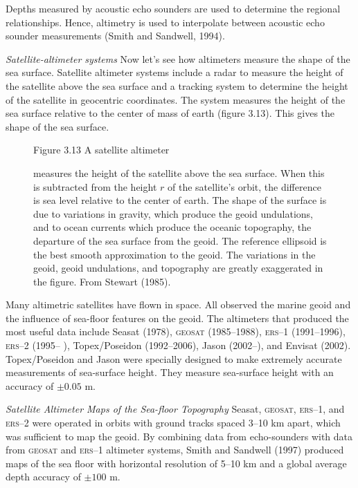 Depths measured by acoustic echo sounders are used to determine the
regional relationships. Hence, altimetry is used to interpolate
between acoustic echo sounder measurements (Smith and Sandwell, 1994).

\textit{Satellite-altimeter systems} Now let's see how altimeters measure the
shape of the sea surface. Satellite altimeter systems include a radar
to measure the height of the satellite above the sea surface and a
tracking system to determine the height of the satellite in geocentric
coordinates. The system measures the height of the sea surface
relative to the center of mass of earth (figure 3.13). This gives the
shape of the sea surface.

\begin{figure}[t!]
\footnotesize
Figure 3.13 A satellite altimeter \rule{0mm}{3ex}measures the height
of the satellite above the sea surface. When this is subtracted from
the height $r$ of the satellite's orbit, the difference is sea level
relative to the center of earth. The shape of the surface is due to
variations in gravity, which produce the geoid
undulations, and to ocean currents which
produce the oceanic topography, the departure of the sea surface from
the geoid. The reference ellipsoid is the best smooth
approximation to the geoid. The variations in the geoid, geoid
undulations, and topography are greatly exaggerated in the
figure. From Stewart (1985).
\label{fig:altimetersketch}
\vspace{-4ex}
\end{figure}

Many altimetric satellites have flown in space. All observed the
marine geoid and the influence of sea-floor features on
the geoid. The altimeters that produced the most useful
data include Seasat (1978), \textsc{geosat}
(1985--1988), \textsc{ers}--1 (1991--1996),
\textsc{ers}--2 (1995-- ), Topex/Poseidon
(1992--2006), Jason (2002--), and Envisat
(2002).  Topex/Poseidon and Jason were specially
designed to make extremely accurate measurements of sea-surface
height. They measure sea-surface height with an accuracy of $\pm 0.05$
m.

\textit{Satellite Altimeter Maps of the Sea-floor Topography}
Seasat, \textsc{geosat}, \textsc{ers}--1,
and \textsc{ers}--2 were operated in orbits with
ground tracks spaced 3--10 km apart, which was sufficient to map the
geoid. By combining data from echo-sounders with data
from \textsc{geosat} and \textsc{ers}--1 altimeter systems, Smith and
Sandwell (1997) produced maps of the sea floor with horizontal
resolution of 5--10 km and a global average depth accuracy of $\pm
100$ m.

